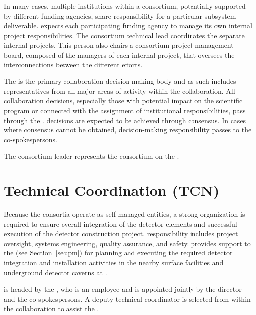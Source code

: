 In many cases, multiple institutions within a consortium, potentially supported by different funding agencies, share responsibility for a particular subsystem deliverable. 
 expects each participating funding agency to manage its
own internal project responsibilities.  The consortium technical lead coordinates the separate internal projects. This person also chairs a consortium project management board, composed of the managers of each internal project, that oversees the
interconnections between the different efforts.



The   is the primary
collaboration decision-making body and as such includes
representatives from all major areas of activity within the
collaboration.  All collaboration decisions, especially those with
potential impact on the  scientific program or connected with the
assignment of institutional responsibilities, pass through the
.   decisions are expected to be
achieved through consensus.  In cases where consensus cannot be
obtained, decision-making responsibility passes to the
co-spokespersons.

The consortium leader represents the consortium on the .


\section{Technical Coordination (TCN)}
\label{sec:tc}

Because the consortia operate as self-managed entities, a strong
 organization is required to ensure 
overall integration of the detector elements and successful
execution of the detector construction project.  
responsibility includes project oversight,
systems engineering, quality assurance, and safety.  
provides support to the  (see
Section~\ref{sec:pm}) for planning and executing the required detector
integration and installation activities in the nearby surface
facilities and underground detector caverns at \surf.


 is headed by the , who is an 
 employee and is appointed jointly by the   director and
the  co-spokespersons.  A deputy technical coordinator is
selected from within the collaboration to assist the . %



